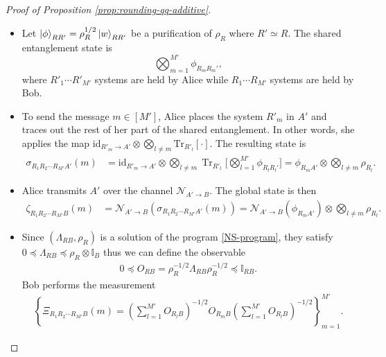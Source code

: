 \documentclass[a4paper,onecolumn,11pt,accepted=2025-10-01]{quantumarticle}
\newcommand*{\dI}{\mathbb{I}}
\newcommand*{\cN}{\mathcal{N}}
\newcommand*{\id}{\mathrm{id}}
\newcommand*{\ptr}[2]{\mathrm{Tr}_{#1}\left[#2\right]}
\newcommand*{\mle}{\preccurlyeq}
\begin{document}
\begin{proof}[Proof of Proposition \ref{prop:rounding-qq-additive}]
\begin{itemize}
    \item[\textbf{Shared entanglement.}] Let $\ket{\phi}_{RR'} = \rho_R^{1/2}\ket{w}_{RR'}$ be a purification of $\rho_{R}$ where $R'\simeq R$. The shared entanglement state is 
    \begin{equation}
        \bigotimes_{m=1}^{M'} \phi_{R_mR_m'},
    \end{equation}
    where $R'_1\cdots R'_{M'}$ systems are held by Alice while $R_1\cdots R_{M'}$ systems are held by Bob.
    \item[\textbf{Encoding.}] To send the message $m\in [M']$, Alice places the system $R'_m$ in $A'$ and traces out the rest of her part of the shared entanglement.  In other words, she applies the map $\id_{R'_m\rightarrow A'}\otimes \bigotimes_{l\neq m}\ptr{R'_{l}}{\cdot}$. The resulting state is 
    \begin{align}
        \sigma_{R_1R_2\cdots R_{M'} A'}(m) &= \id_{R'_m\rightarrow A'}\otimes \bigotimes_{l\neq m}\operatorname{Tr}_{R'_{l}}\bigg[\bigotimes_{l=1}^{M'} \phi_{R_{l}R_{l}'} \bigg] 
         =\phi_{R_m A'}\otimes \bigotimes_{l\neq m} \rho_{R_l}.   
    \end{align}
    \item[\textbf{Transmission.}] Alice transmits $A'$ over the channel $\cN_{A'\rightarrow B}$. The global state is then 
    \begin{align}
        \zeta_{R_1R_2\cdots R_{M'} B}(m) &= \cN_{A'\rightarrow B}(\sigma_{R_1R_2\cdots R_{M'} A'}(m))
        =\cN_{A'\rightarrow B}\left(\phi_{R_m A'}\right)\otimes \bigotimes_{l\neq m} \rho_{R_l}.
    \end{align}
    \item[\textbf{Decoding.}] Since $(\Lambda_{RB}, \rho_{R})$ is a solution of the program \eqref{NS-program}, they satisfy $0\mle \Lambda_{RB}\mle \rho_R\otimes \dI_B $ thus we can define the observable
    \begin{align}
        0\mle O_{RB} = \rho_R^{-1/2} \Lambda_{RB}\rho_R^{-1/2} \mle \dI_{RB}.
    \end{align}
    Bob performs the measurement \cite{Hayashi2003Jun}
    \begin{align}
        \left\{ \Xi_{R_1R_2\cdots R_{M'} B}(m) = \left(\textstyle\sum_{l=1}^{M'} O_{R_lB}\right)^{-1/2}O_{R_mB} \left(\textstyle\sum_{l=1}^{M'} O_{R_lB}\right)^{-1/2}\right\}_{m=1}^{M'}.
    \end{align}
\end{itemize}


\end{proof}
\end{document}
